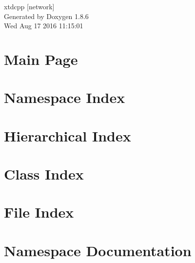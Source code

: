 \documentclass[twoside]{book}
\newcommand{\clearemptydoublepage}{%
  \newpage{\pagestyle{empty}\cleardoublepage}%
}
\begin{document}
\hypersetup{pageanchor=false}
\begin{titlepage}
\vspace*{7cm}
\begin{center}%
{\Large xtdcpp \mbox{[}network\mbox{]} }\\
\vspace*{1cm}
{\large Generated by Doxygen 1.8.6}\\
\vspace*{0.5cm}
{\small Wed Aug 17 2016 11:15:01}\\
\end{center}
\end{titlepage}
\clearemptydoublepage
\tableofcontents
\clearemptydoublepage
{}
\hypersetup{pageanchor=true}

\chapter{Main Page}
\label{index}\hypertarget{index}{}
\chapter{Namespace Index}

\chapter{Hierarchical Index}

\chapter{Class Index}

\chapter{File Index}

\chapter{Namespace Documentation}








\end{document}
